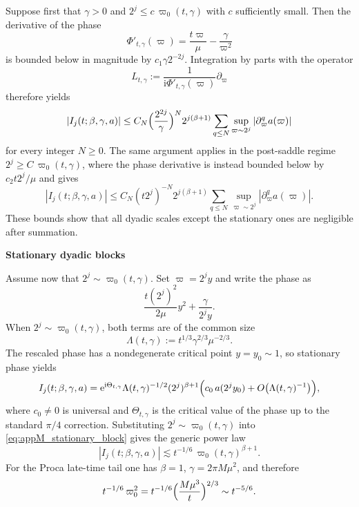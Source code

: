 \documentclass[12pt]{article}
\numberwithin{equation}{section}
\theoremstyle{plain}
\theoremstyle{definition}
\theoremstyle{remark}
\newcommand{\ii}{\mathrm i}
\newcommand{\ee}{\mathrm e}
\newcommand{\vp}{\varpi}
\newcommand{\abs}[1]{\left|#1\right|}
\newcommand{\appheading}[1]{\par\medskip\noindent\textbf{#1}\par\smallskip\noindent}
\begin{document}
Suppose first that $\gamma>0$ and $2^j\le c\,\vp_0(t,\gamma)$ with $c$ sufficiently small.  Then the derivative of the phase
\[
   \Phi'_{t,\gamma}(\vp)=\frac{t\vp}{\mu}-\frac{\gamma}{\vp^2}
\]
is bounded below in magnitude by $c_1\gamma 2^{-2j}$.  Integration by parts with the operator
\[
   L_{t,\gamma}
   :=
   \frac{1}{\ii\Phi'_{t,\gamma}(\vp)}\partial_\vp
\]
therefore yields
\begin{equation}\label{eq:appM_presaddle}
   \abs{I_j(t;\beta,\gamma,a)}
   \le
   C_N
   \Bigl(\frac{2^{2j}}{\gamma}\Bigr)^N
   2^{j(\beta+1)}
   \sum_{q\le N}\sup_{\vp\sim2^j}\abs{\partial_\vp^q a(\vp)}
\end{equation}
for every integer $N\ge0$.  The same argument applies in the post-saddle regime $2^j\ge C\,\vp_0(t,\gamma)$, where the phase derivative is instead bounded below by $c_2 t2^j/\mu$ and gives
\begin{equation}\label{eq:appM_postsaddle}
   \abs{I_j(t;\beta,\gamma,a)}
   \le
   C_N
   (t2^j)^{-N}
   2^{j(\beta+1)}
   \sum_{q\le N}\sup_{\vp\sim2^j}\abs{\partial_\vp^q a(\vp)}.
\end{equation}
These bounds show that all dyadic scales except the stationary ones are negligible after summation.

\appheading{Stationary dyadic blocks}

Assume now that $2^j\sim\vp_0(t,\gamma)$.  Set $\vp=2^jy$ and write the phase as
\[
   \frac{t(2^j)^2}{2\mu}y^2+\frac{\gamma}{2^j y}.
\]
When $2^j\sim\vp_0(t,\gamma)$, both terms are of the common size
\[
   \Lambda(t,\gamma):=t^{1/3}\gamma^{2/3}\mu^{-2/3}.
\]
The rescaled phase has a nondegenerate critical point $y=y_0\sim1$, so stationary phase yields
\begin{equation}\label{eq:appM_stationary_block}
   I_j(t;\beta,\gamma,a)
   =
   \ee^{\ii\Theta_{t,\gamma}}
   \Lambda(t,\gamma)^{-1/2}
   (2^j)^{\beta+1}
   \Bigl(
      c_0\,a(2^j y_0)
      +
      O\bigl(\Lambda(t,\gamma)^{-1}\bigr)
   \Bigr),
\end{equation}
where $c_0\neq0$ is universal and $\Theta_{t,\gamma}$ is the critical value of the phase up to the standard $\pi/4$ correction.  Substituting $2^j\sim\vp_0(t,\gamma)$ into \eqref{eq:appM_stationary_block} gives the generic power law
\[
   \abs{I_j(t;\beta,\gamma,a)}
   \lesssim
   t^{-1/6}\,\vp_0(t,\gamma)^{\beta+1}.
\]
For the Proca late-time tail one has $\beta=1$, $\gamma=2\pi M\mu^2$, and therefore
\[
   t^{-1/6}\,\vp_0^2
   =
   t^{-1/6}\Bigl(\frac{M\mu^3}{t}\Bigr)^{2/3}
   \sim t^{-5/6}.
\]
\end{document}
